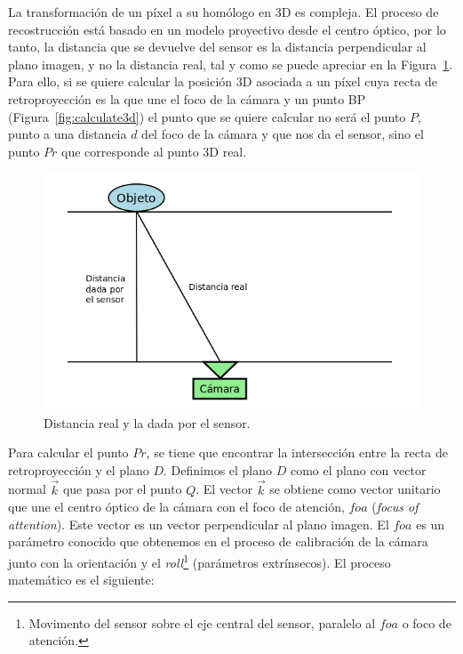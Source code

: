 La transformación de un píxel a su homólogo en 3D es compleja. El proceso de recostrucción está basado en un modelo proyectivo desde el centro óptico, por lo tanto, la distancia que se devuelve del sensor es la distancia perpendicular al plano imagen, y no la distancia real, tal y como se puede apreciar en la Figura~\ref{fig:distPoint}. Para ello, si se quiere calcular la posición 3D asociada a un píxel cuya recta de retroproyección es la que une el foco de la cámara y un punto BP (Figura~\ref{fig:calculate3d}) el punto que se quiere calcular no será el punto $P$, punto a una distancia $d$ del foco de la cámara y que nos da el sensor, sino el punto $Pr$ que corresponde al punto 3D real.

\begin{figure}[th]
\centering
\includegraphics[scale=0.4]{Figures/dist-point.png}
\decoRule
\caption[dist-point]{Distancia real y la dada por el sensor.}
\label{fig:distPoint}
\end{figure}

Para calcular el punto $Pr$, se tiene que encontrar la intersección entre la recta de retroproyección y el plano $D$. Definimos el plano $D$ como el plano con vector normal $\vec{k}$ que pasa por el punto $Q$. El vector $\vec{k}$ se obtiene como vector unitario que une el centro óptico de la cámara con el foco de atención, $foa$ (\textit{focus of attention}). Este vector es un vector perpendicular al plano imagen. El $foa$ es un parámetro conocido que obtenemos en el proceso de calibración de la cámara junto con la orientación y el \textit{roll}\footnote{Movimento del sensor sobre el eje central del sensor, paralelo al $foa$ o foco de atención.} (parámetros extrínsecos). El proceso matemático es el siguiente:

